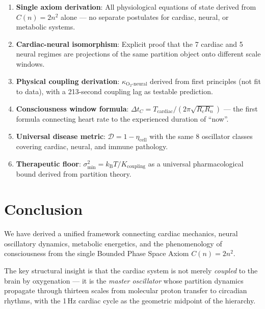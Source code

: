 \documentclass[12pt,a4paper]{article}
\theoremstyle{definition}
\newcommand{\kBT}{k_{\text{B}}T}
\begin{document}
\begin{enumerate}
\item \textbf{Single axiom derivation}: All physiological equations of state
  derived from $C(n) = 2n^2$ alone — no separate postulates for cardiac,
  neural, or metabolic systems.

\item \textbf{Cardiac-neural isomorphism}: Explicit proof that the 7 cardiac
  and 5 neural regimes are projections of the same partition object onto
  different scale windows.

\item \textbf{Physical coupling derivation}: $\kappa_{\text{O}_2\text{-neural}}$
  derived from first principles (not fit to data), with a 213-second coupling
  lag as testable prediction.

\item \textbf{Consciousness window formula}: $\Delta t_C = T_{\text{cardiac}}/(2\pi\sqrt{R_c R_n})$
  — the first formula connecting heart rate to the experienced duration of ``now''.

\item \textbf{Universal disease metric}: $\mathcal{D} = 1 - \eta_{\text{cell}}$
  with the same 8 oscillator classes covering cardiac, neural, and immune pathology.

\item \textbf{Therapeutic floor}: $\sigma^2_{\min} = \kBT/K_{\text{coupling}}$
  as a universal pharmacological bound derived from partition theory.
\end{enumerate}

\section{Conclusion}
\label{sec:conclusion}

We have derived a unified framework connecting cardiac mechanics,
neural oscillatory dynamics, metabolic energetics, and the phenomenology
of consciousness from the single Bounded Phase Space Axiom $C(n) = 2n^2$.

The key structural insight is that the cardiac system is not merely
\emph{coupled} to the brain by oxygenation — it is the \emph{master oscillator}
whose partition dynamics propagate through thirteen scales from molecular
proton transfer to circadian rhythms, with the 1\,Hz cardiac cycle as the
geometric midpoint of the hierarchy.
\end{document}
